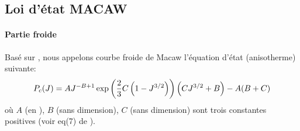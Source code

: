 \documentclass[10pt]{book}
\begin{document}
\subsection{Loi d'état MACAW}
\paragraph{Partie froide}
Basé sur \cite{lozano2022robust}, nous appelons courbe froide de Macaw l'équation d'état (anisotherme) suivante:
\begin{equation}
P_{c}(J)=AJ^{-B+1}\exp\left(\dfrac{2}{3}C\left(1-J^{3/2}\right)\right)\left(CJ^{3/2}+B\right) - A(B+C)
\label{eq:P_isoT_MACAW}
\end{equation}
où $A$ (en \pascal), $B$ (sans dimension), $C$ (sans dimension) sont trois constantes positives (voir eq(7) de \cite{lozano2023analytic}).
\end{document}
